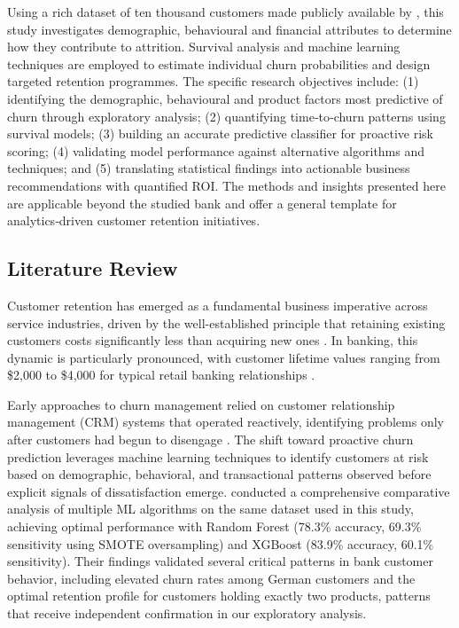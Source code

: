 \documentclass[12pt]{article}
\begin{document}
Using a rich dataset of ten thousand customers made publicly available by \citet{kollipara2022bank}, this study investigates demographic, behavioural and financial attributes to determine how they contribute to attrition.  Survival analysis and machine learning techniques are employed to estimate individual churn probabilities and design targeted retention programmes.  The specific research objectives include: (1) identifying the demographic, behavioural and product factors most predictive of churn through exploratory analysis; (2) quantifying time‑to‑churn patterns using survival models; (3) building an accurate predictive classifier for proactive risk scoring; (4) validating model performance against alternative algorithms and techniques; and (5) translating statistical findings into actionable business recommendations with quantified ROI.  The methods and insights presented here are applicable beyond the studied bank and offer a general template for analytics‑driven customer retention initiatives.

\subsection{Literature Review}
Customer retention has emerged as a fundamental business imperative across service industries, driven by the well-established principle that retaining existing customers costs significantly less than acquiring new ones \citep{businessbuilders2024cost}. In banking, this dynamic is particularly pronounced, with customer lifetime values ranging from \$2,000 to \$4,000 for typical retail banking relationships \citep{meleis2010clv}.

Early approaches to churn management relied on customer relationship management (CRM) systems that operated reactively, identifying problems only after customers had begun to disengage \citep{singh2024productchurn}. The shift toward proactive churn prediction leverages machine learning techniques to identify customers at risk based on demographic, behavioral, and transactional patterns observed before explicit signals of dissatisfaction emerge. \citet{singh2024productchurn} conducted a comprehensive comparative analysis of multiple ML algorithms on the same dataset used in this study, achieving optimal performance with Random Forest (78.3\% accuracy, 69.3\% sensitivity using SMOTE oversampling) and XGBoost (83.9\% accuracy, 60.1\% sensitivity). Their findings validated several critical patterns in bank customer behavior, including elevated churn rates among German customers and the optimal retention profile for customers holding exactly two products, patterns that receive independent confirmation in our exploratory analysis.
\end{document}
